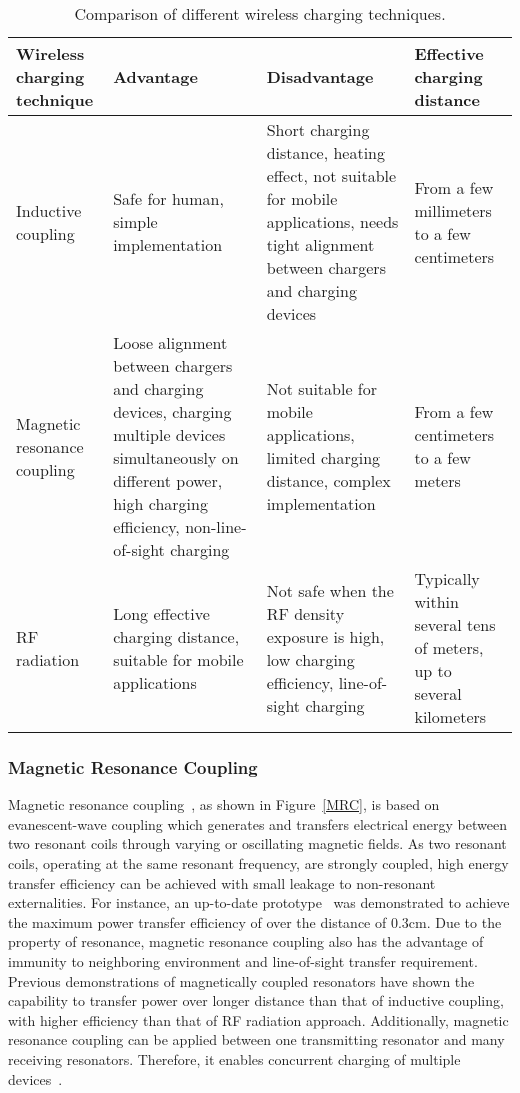 \documentclass[twocolumn,10pt]{IEEEtran}
\begin{document}
\begin{table*} \small \centering
\caption{\footnotesize Comparison of different wireless charging techniques.} \label{WET}
\begin{tabular}{|p{2.5cm}|p{5cm}|p{5cm}|p{3.5cm}|} 
\hline
\footnotesize {\bf Wireless charging technique} & {\bf Advantage} & {\bf Disadvantage} & {\bf Effective charging distance}    \\
\hline
Inductive coupling & Safe for human, simple implementation  & Short charging distance, heating effect, not suitable for mobile applications, needs tight alignment between chargers and charging devices & From a few millimeters to a few centimeters \\ \hline
Magnetic resonance coupling & Loose alignment between chargers and charging devices, charging multiple devices simultaneously on different power, high charging efficiency, non-line-of-sight charging  & Not suitable for mobile applications, limited charging distance, complex implementation &  From a few centimeters to a few meters \\ \hline
RF radiation & Long effective charging distance, suitable for mobile applications & Not safe when the RF density exposure is high, low charging efficiency, line-of-sight charging  & Typically within several tens of meters, up to several kilometers \\ \hline
\end{tabular}
\end{table*}  
 
\subsubsection{Magnetic Resonance Coupling}

Magnetic resonance coupling~\cite{A.2008Karalis}, as shown in Figure~\ref{MRC}, is based on evanescent-wave coupling which generates and transfers electrical energy between two resonant coils through varying or oscillating magnetic fields. As two resonant coils, operating at the same resonant frequency, are strongly coupled, high energy transfer efficiency can be achieved with small leakage to non-resonant externalities.
For instance, an up-to-date prototype~\cite{X.Li2015} was demonstrated to achieve the maximum power transfer efficiency of  over the distance of 0.3cm. 
Due to the property of resonance, magnetic resonance coupling also has the advantage of immunity to neighboring environment and line-of-sight transfer requirement.  
Previous demonstrations \cite{Kurs2007A,B.2009Cannon,C.2008Zhu,N.2009Low} of magnetically coupled resonators have shown the capability to transfer power over longer distance than that of inductive coupling, with higher efficiency than that of RF radiation approach. Additionally, magnetic resonance coupling can be applied between one transmitting resonator and many receiving resonators. Therefore, it enables concurrent charging of multiple devices~\cite{A.2010Kurs,S.2011Rajagopal,J.2012Choi,Z.2012Kim,B.2009Cannon}.
\end{document}
